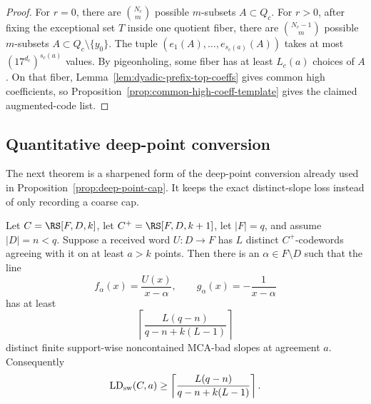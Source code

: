 \begin{proof}
For \(r=0\), there are \(\binom{N_c}{m}\) possible \(m\)-subsets
\(A\subset Q_c\).  For \(r>0\), after fixing the exceptional set \(T\) inside
one quotient fiber, there are \(\binom{N_c-1}{m}\) possible \(m\)-subsets
\(A\subset Q_c\setminus\{y_0\}\).  The tuple
\((e_1(A),\ldots,e_{s_c(a)}(A))\) takes at most \((17^{d_c})^{s_c(a)}\) values.
By pigeonholing, some fiber has at least \(L_c(a)\) choices of \(A\).  On that
fiber, Lemma~\ref{lem:dyadic-prefix-top-coeffs} gives common high coefficients,
so Proposition~\ref{prop:common-high-coeff-template} gives the claimed
augmented-code list.
\end{proof}

\subsection{Quantitative deep-point conversion}

The next theorem is a sharpened form of the deep-point conversion already used
in Proposition~\ref{prop:deep-point-cap}.  It keeps the exact distinct-slope
loss instead of only recording a coarse cap.

\begin{theorem}
\label{thm:quant-deep-point}
Let \(C=\RS[F,D,k]\), let \(C^+=\RS[F,D,k+1]\), let \(|F|=q\), and assume
\(|D|=n<q\).  Suppose a received word \(U:D\to F\) has \(L\) distinct
\(C^+\)-codewords agreeing with it on at least \(a>k\) points.  Then there is
an \(\alpha\in F\setminus D\) such that the line
\[
  f_\alpha(x)=\frac{U(x)}{x-\alpha},
  \qquad
  g_\alpha(x)=-\frac1{x-\alpha}
\]
has at least
\[
  \left\lceil
  \frac{L(q-n)}{q-n+k(L-1)}
  \right\rceil
\]
distinct finite support-wise noncontained MCA-bad slopes at agreement \(a\).
Consequently
\[
  \operatorname{LD}_{\rm sw}(C,a)
  \ge
  \left\lceil
  \frac{L(q-n)}{q-n+k(L-1)}
  \right\rceil .
\]
\end{theorem}

